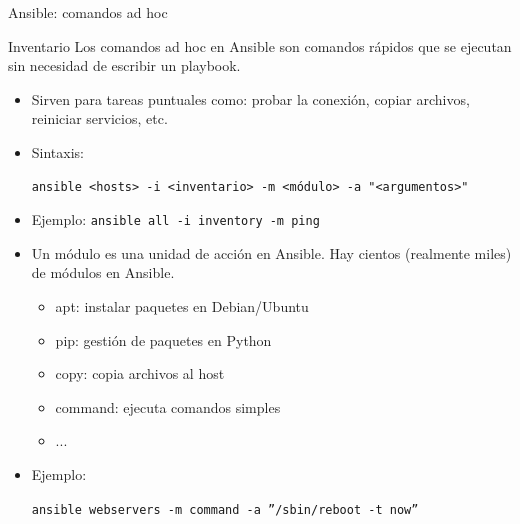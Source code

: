 \documentclass{beamer}
\begin{document}
\begin{frame}[fragile]{Ansible: comandos ad hoc}

\begin{block}{Inventario}
Los comandos ad hoc en Ansible son comandos rápidos que se ejecutan sin necesidad de escribir un playbook.
\end{block}

\begin{itemize}
    \item Sirven para tareas puntuales como: probar la conexión, copiar archivos, reiniciar servicios, etc.
    \item Sintaxis:

    \begin{verbatim}
ansible <hosts> -i <inventario> -m <módulo> -a "<argumentos>"
\end{verbatim}

\item Ejemplo: \texttt{ansible all -i inventory -m ping}

\item Un módulo es una unidad de acción en Ansible. Hay cientos (realmente miles) de módulos en Ansible.

\begin{itemize}
    \item apt: instalar paquetes en Debian/Ubuntu
    \item pip: gestión de paquetes en Python
    \item copy: copia archivos al host
    \item command: ejecuta comandos simples
    \item ...
\end{itemize}

\item Ejemplo: 

{\scriptsize\texttt{ansible webservers -m command -a ''/sbin/reboot -t now''}}
    
\end{itemize}

    
\end{frame}
\end{document}
